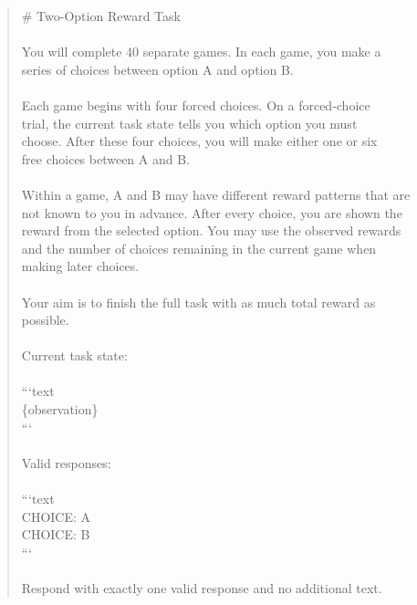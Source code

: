 \documentclass[logo,msc,inf]{infthesis}       %
\begin{document}
\begin{quote}\ttfamily\footnotesize
\# Two-Option Reward Task \\
\\
You will complete 40 separate games. In each game, you make a \\
series of choices between option A and option B. \\
\\
Each game begins with four forced choices. On a forced-choice \\
trial, the current task state tells you which option you must \\
choose. After these four choices, you will make either one or six \\
free choices between A and B. \\
\\
Within a game, A and B may have different reward patterns that are \\
not known to you in advance. After every choice, you are shown the \\
reward from the selected option. You may use the observed rewards \\
and the number of choices remaining in the current game when \\
making later choices. \\
\\
Your aim is to finish the full task with as much total reward as \\
possible. \\
\\
Current task state: \\
\\
```text \\
\{observation\} \\
``` \\
\\
Valid responses: \\
\\
```text \\
CHOICE: A \\
CHOICE: B \\
``` \\
\\
Respond with exactly one valid response and no additional text. \\
\end{quote}
\end{document}
